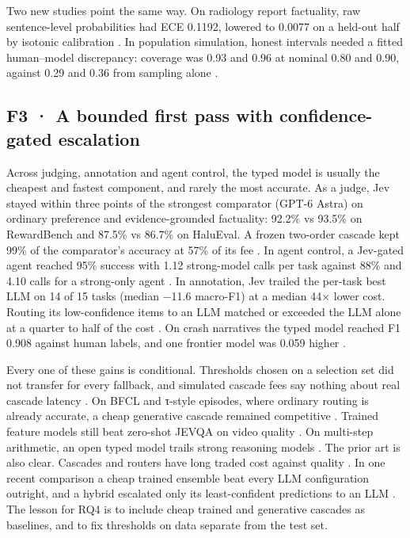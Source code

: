 Two new studies point the same way. On radiology report factuality, raw sentence-level probabilities had ECE 0.1192, lowered to 0.0077 on a held-out half by isotonic calibration \citep{arxiv2609_27607}. In population simulation, honest intervals needed a fitted human–model discrepancy: coverage was 0.93 and 0.96 at nominal 0.80 and 0.90, against 0.29 and 0.36 from sampling alone \citep{arxiv2609_27535}.

\subsection{F3 · A bounded first pass with confidence-gated escalation}

Across judging, annotation and agent control, the typed model is usually the cheapest and fastest component, and rarely the most accurate. As a judge, Jev stayed within three points of the strongest comparator (GPT-6 Astra) on ordinary preference and evidence-grounded factuality: 92.2\% vs 93.5\% on RewardBench and 87.5\% vs 86.7\% on HaluEval. A frozen two-order cascade kept 99\% of the comparator's accuracy at 57\% of its fee \citep{arxiv2609_26550}. In agent control, a Jev-gated agent reached 95\% success with 1.12 strong-model calls per task against 88\% and 4.10 calls for a strong-only agent \citep{arxiv2609_26532}. In annotation, Jev trailed the per-task best LLM on 14 of 15 tasks (median −11.6 macro-F1) at a median 44× lower cost. Routing its low-confidence items to an LLM matched or exceeded the LLM alone at a quarter to half of the cost \citep{arxiv2609_24574}. On crash narratives the typed model reached F1 0.908 against human labels, and one frontier model was 0.059 higher \citep{arxiv2609_24052}.

Every one of these gains is conditional. Thresholds chosen on a selection set did not transfer for every fallback, and simulated cascade fees say nothing about real cascade latency \citep{arxiv2609_26550}. On BFCL and τ-style episodes, where ordinary routing is already accurate, a cheap generative cascade remained competitive \citep{arxiv2609_26532}. Trained feature models still beat zero-shot JEVQA on video quality \citep{arxiv2609_24395}. On multi-step arithmetic, an open typed model trails strong reasoning models \citep{arxiv2609_23886}. The prior art is also clear. Cascades and routers have long traded cost against quality \citep{arxiv2305_05176,arxiv2406_18665,arxiv2601_07206}. In one recent comparison a cheap trained ensemble beat every LLM configuration outright, and a hybrid escalated only its least-confident predictions to an LLM \citep{arxiv2609_17977}. The lesson for RQ4 is to include cheap trained and generative cascades as baselines, and to fix thresholds on data separate from the test set.

